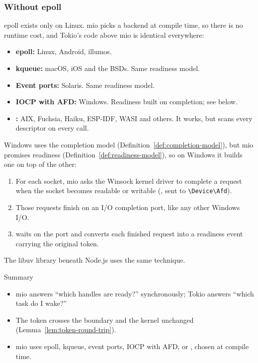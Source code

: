 \subsubsection{Without epoll}

epoll exists only on Linux. mio picks a backend at compile time, so there is no runtime cost, and Tokio's code above mio is identical everywhere:

\begin{itemize}
    \item \textbf{epoll:} Linux, Android, illumos.
    \item \textbf{kqueue:} macOS, iOS and the BSDs. Same readiness model.
    \item \textbf{Event ports:} Solaris. Same readiness model.
    \item \textbf{IOCP with AFD:} Windows. Readiness built on completion; see below.
    \item \textbf{:} AIX, Fuchsia, Haiku, ESP-IDF, WASI and others. It works, but scans every descriptor on every call.
\end{itemize}

Windows uses the completion model (Definition~\ref{def:completion-model}), but mio promises readiness (Definition~\ref{def:readiness-model}), so on Windows it builds one on top of the other:

\begin{enumerate}
    \item For each socket, mio asks the Winsock kernel driver to complete a request when the socket becomes readable or writable (, sent to \texttt{\textbackslash Device\textbackslash Afd}).
    \item Those requests finish on an I/O completion port, like any other Windows I/O.
    \item {} waits on the port and converts each finished request into a readiness event carrying the original token.
\end{enumerate}

The libuv library beneath Node.js uses the same technique.

\begin{quotebox}{Summary}
    \begin{itemize}
        \item mio answers ``which handles are ready?'' synchronously; Tokio answers ``which task do I wake?''
        \item The token crosses the boundary and the kernel unchanged (Lemma~\ref{lem:token-round-trip}).
        \item mio uses epoll, kqueue, event ports, IOCP with AFD, or , chosen at compile time.
    \end{itemize}
\end{quotebox}

